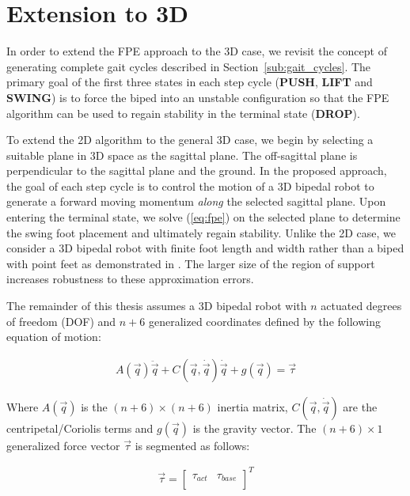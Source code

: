 \section{Extension to 3D} %
\label{sec:extension_to_3d}

In order to extend the FPE approach to the 3D case, we revisit the concept of generating complete gait cycles described in Section~\ref{sub:gait_cycles}. The primary goal of the first three states in each step cycle (\textbf{PUSH}, \textbf{LIFT} and \textbf{SWING}) is to force the biped into an unstable configuration so that the FPE algorithm can be used to regain stability in the terminal state (\textbf{DROP}).

To extend the 2D algorithm to the general 3D case, we begin by selecting a suitable plane in 3D space as the sagittal plane. The off-sagittal plane is perpendicular to the sagittal plane and the ground.  In the proposed approach, the goal of each step cycle is to control the motion of a 3D bipedal robot to generate a forward moving momentum \emph{along} the selected sagittal plane. Upon entering the terminal state, we solve (\ref{eq:fpe}) on the selected plane to determine the swing foot placement and ultimately regain stability. Unlike the 2D case, we consider a 3D bipedal robot with finite foot length and width rather than a biped with point feet as demonstrated in \cite{Wight:2008ii}. The larger size of the region of support increases robustness to these approximation errors.

The remainder of this thesis assumes a 3D bipedal robot with $n$ actuated degrees of freedom (DOF) and $n+6$ generalized coordinates defined by the following equation of motion:

\begin{eqnarray}
	\label{eq:eom}
	A(\vec{q})\ddot{\vec{q}} + C(\vec{q},\dot{\vec{q}})\dot{\vec{q}} + g(\vec{q}) = \vec{\tau}
\end{eqnarray}

Where $A(\vec{q})$ is the $(n+6) \times (n+6)$ inertia matrix, $C(\vec{q},\dot{\vec{q}})$ are the centripetal/Coriolis terms and $g(\vec{q})$ is the gravity vector. The $(n+6) \times 1$ generalized force vector $\vec{\tau}$ is segmented as follows:

\begin{eqnarray}
	\label{eq:gentau}
	\vec{\tau} = {\begin{bmatrix} \tau_{act} & \tau_{base} \\ \end{bmatrix}}^T
\end{eqnarray}

